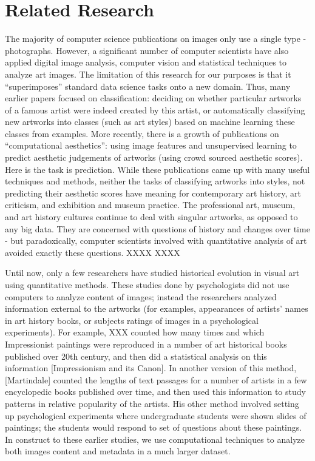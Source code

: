 \documentclass[letterpaper]{article}
\begin{document}
\section{Related Research}
The majority of computer science publications on images only use a single type - photographs. However, a significant number of computer scientists have also applied digital image analysis, computer vision and statistical techniques to analyze art images. The limitation of this research for our purposes is that it “superimposes” standard data science tasks onto a new domain. Thus, many earlier papers focused on classification: deciding on whether particular artworks of a famous artist were indeed created by this artist, or automatically classifying new artworks into classes (such as art styles) based on machine learning these classes from examples. More recently, there is a growth of publications on “computational aesthetics”: using image features and unsupervised learning to predict aesthetic judgements of artworks (using crowd sourced aesthetic scores). Here is the task is prediction.
 	While these publications came up with many useful techniques and methods, neither the tasks of classifying artworks into styles, not predicting their aesthetic scores have meaning for contemporary art history, art criticism, and exhibition and museum practice. The professional art, museum, and art history cultures continue to deal with singular artworks, as opposed to any big data. They are concerned with questions of history and changes over time - but paradoxically, computer scientists involved with quantitative analysis of art avoided exactly these questions. 
XXXX
XXXX

Until now, only a few researchers have studied historical evolution in visual art using quantitative methods. These studies done by psychologists did not use computers to analyze content of images; instead the researchers analyzed information external to the artworks (for examples, appearances of artists’ names in art history books, or subjects ratings of images in a psychological experiments).  For example, XXX counted how many times and which Impressionist paintings were reproduced in a number of art historical books published over 20th century, and then did a statistical analysis on this information [Impressionism and its Canon]. In another version of this method, [Martindale] counted the lengths of text passages for a number of artists in a few encyclopedic books published over time, and then used this information to study patterns in relative popularity of the artists. His other method involved setting up psychological experiments where undergraduate students were shown slides of paintings; the students would respond to set of questions about these paintings. In construct to these earlier studies, we use computational techniques to analyze both images content and metadata in a much larger dataset.
\end{document}
